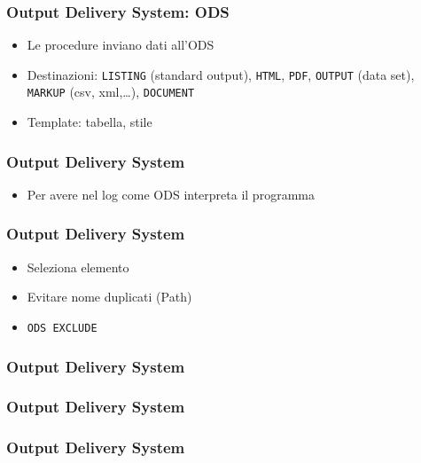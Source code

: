 \documentclass[aspectratio=169]{beamer}
\begin{document}
\begin{frame}[containsverbatim]\frametitle{Output Delivery System: ODS}
  \begin{itemize}
  \item
    Le procedure inviano dati all'ODS
  \item
    Destinazioni: \verb+LISTING+ (standard output), \verb+HTML+, \verb+PDF+,
    \verb+OUTPUT+ (data set), \verb+MARKUP+ (csv, xml,\ldots), \verb+DOCUMENT+
  \item
    Template: tabella, stile
  \end{itemize}
\end{frame}


\begin{frame}[containsverbatim]\frametitle{Output Delivery System}
  \begin{itemize}
  \item
    Per avere nel log come ODS interpreta il programma
  \end{itemize}
\end{frame}


\begin{frame}[containsverbatim]\frametitle{Output Delivery System}
  \begin{itemize}
  \item
    Seleziona elemento
  \item
    Evitare nome duplicati (Path)
  \item
    \verb+ODS EXCLUDE+
  \end{itemize}
\end{frame}

\begin{frame}[containsverbatim]\frametitle{Output Delivery System}
\end{frame}


\begin{frame}[containsverbatim]\frametitle{Output Delivery System}
\end{frame}


\begin{frame}[containsverbatim]\frametitle{Output Delivery System}
\end{frame}
\end{document}
